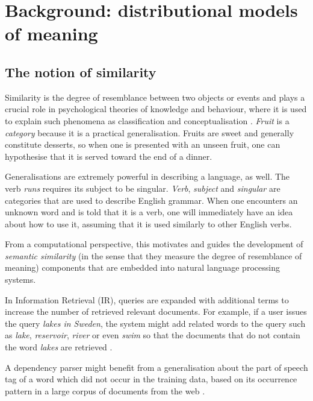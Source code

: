 \chapter{Background: distributional models of meaning}
\label{cha:background}

\section{The notion of similarity}
\label{sec:similarity}

Similarity is the degree of resemblance between two objects or events \cite{WCS:WCS1282} and plays a crucial role in psychological theories of knowledge and behaviour, where it is used to explain such phenomena as classification and conceptualisation \cite{Tversky1977,1986-13502-00119860101,medin1993respects,Markman1996,hahn1997concepts}. \textit{Fruit} is a \emph{category} because it is a practical generalisation. Fruits are sweet and generally constitute desserts, so when one is presented with an unseen fruit, one can hypothesise that it is served toward the end of a dinner.

Generalisations are extremely powerful in describing a language, as well. The verb \textit{runs} requires its subject to be singular. \textit{Verb}, \textit{subject} and \textit{singular} are categories that are used to describe English grammar. When one encounters an unknown word and is told that it is a verb, one will immediately have an idea about how to use it, assuming that it is used similarly to other English verbs.

From a computational perspective, this motivates and guides the development of \emph{semantic similarity} (in the sense that they measure the degree of resemblance of meaning) components that are embedded into natural language processing systems.

In Information Retrieval (IR), queries are expanded with additional terms to increase the number of retrieved relevant documents. For example, if a user issues the query \textit{lakes in Sweden}, the system might add related words to the query such as \textit{lake}, \textit{reservoir}, \textit{river} or even \textit{swim} so that the documents that do not contain the word \textit{lakes} are retrieved \cite{Xu:1996:QEU:243199.243202}.

A dependency parser might benefit from a generalisation about the part of speech tag of a word which did not occur in the training data, based on its occurrence pattern in a large corpus of documents from the web \cite{hermann-blunsom:2013:ACL2013,andreas-klein:2014:P14-2}.

